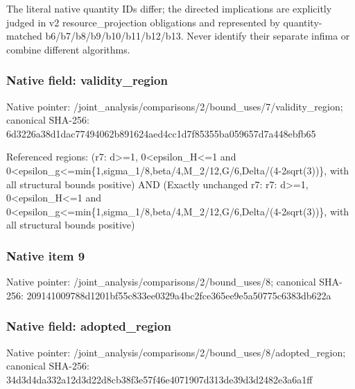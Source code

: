 \documentclass[10pt,a4paper]{article}
\begin{document}
\begingroup\raggedright\sloppy The literal native quantity IDs differ;\allowbreak{} the directed implications are explicitly judged in v2 resource\_\allowbreak{}projection obligations and represented by quantity-matched b6/\allowbreak{}b7/\allowbreak{}b8/\allowbreak{}b9/\allowbreak{}b10/\allowbreak{}b11/\allowbreak{}b12/\allowbreak{}b13. Never identify their separate infima or combine different algorithms.\par\endgroup

\subsubsection{Native field: validity\_\allowbreak{}region}
Native pointer: /joint\_\allowbreak{}analysis/comparisons/2/bound\_\allowbreak{}uses/7/validity\_\allowbreak{}region; canonical SHA-256: 6d3226a38d1dac77494062b891624aed4cc1d7f85355ba059657d7a448ebfb65

\begingroup\raggedright\sloppy Referenced regions:\allowbreak{} (r7:\allowbreak{} d>=\allowbreak{}1,\allowbreak{} 0<epsilon\_\allowbreak{}H<=\allowbreak{}1 and 0<epsilon\_\allowbreak{}g<=\allowbreak{}min\{1,\allowbreak{}sigma\_\allowbreak{}1/\allowbreak{}8,\allowbreak{}beta/\allowbreak{}4,\allowbreak{}M\_\allowbreak{}2/\allowbreak{}12,\allowbreak{}G/\allowbreak{}6,\allowbreak{}Delta/\allowbreak{}(4-2sqrt(3))\},\allowbreak{} with all structural bounds positive) AND (Exactly unchanged r7:\allowbreak{} r7:\allowbreak{} d>=\allowbreak{}1,\allowbreak{} 0<epsilon\_\allowbreak{}H<=\allowbreak{}1 and 0<epsilon\_\allowbreak{}g<=\allowbreak{}min\{1,\allowbreak{}sigma\_\allowbreak{}1/\allowbreak{}8,\allowbreak{}beta/\allowbreak{}4,\allowbreak{}M\_\allowbreak{}2/\allowbreak{}12,\allowbreak{}G/\allowbreak{}6,\allowbreak{}Delta/\allowbreak{}(4-2sqrt(3))\},\allowbreak{} with all structural bounds positive)\par\endgroup

\subsubsection{Native item 9}
Native pointer: /joint\_\allowbreak{}analysis/comparisons/2/bound\_\allowbreak{}uses/8; canonical SHA-256: 209141009788d1201bf55c833ee0329a4bc2fce365ee9e5a50775c6383db622a

\subsubsection{Native field: adopted\_\allowbreak{}region}
Native pointer: /joint\_\allowbreak{}analysis/comparisons/2/bound\_\allowbreak{}uses/8/adopted\_\allowbreak{}region; canonical SHA-256: 34d3d4da332a12d3d22d8cb38f3e57f46e4071907d313de39d3d2482e3a6a1ff
\end{document}
